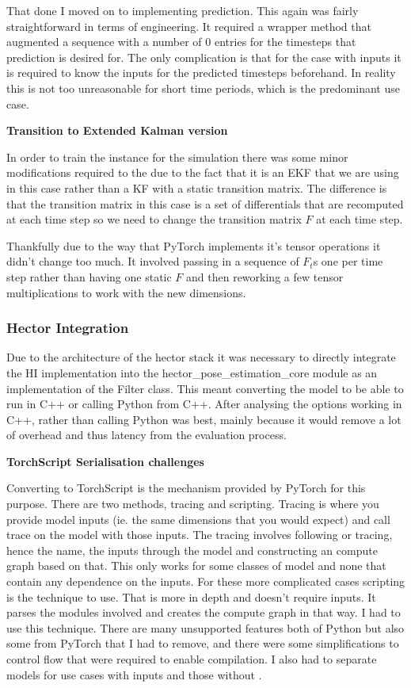 \documentclass[]{../resources/final_report}
\begin{document}
That done I moved on to implementing prediction. This again was fairly straightforward in terms of engineering. It required a wrapper method that augmented a sequence with a number of $0$ entries for the timesteps that prediction is desired for. The only complication is that for the case with inputs it is required to know the inputs for the predicted timesteps beforehand. In reality this is not too unreasonable for short time periods, which is the predominant use case.

\textbf{Transition to Extended Kalman version}

In order to train the instance for the simulation there was some minor modifications required to the due to the fact that it is an EKF that we are using in this case rather than a KF with a static transition matrix. The difference is that the transition matrix in this case is a set of differentials that are recomputed at each time step so we need to change the transition matrix $F$ at each time step.

Thankfully due to the way that PyTorch implements it's tensor operations it didn't change too much. It involved passing in a sequence of $F_t$s one per time step rather than having one static $F$ and then reworking a few tensor multiplications to work with the new dimensions.


\subsubsection{Hector Integration}

Due to the architecture of the hector stack it was necessary to directly integrate the HI implementation into the hector\_pose\_estimation\_core module as an implementation of the Filter class. This meant converting the model to be able to run in C++ or calling Python from C++. After analysing the options working in C++, rather than calling Python was best, mainly because it would remove a lot of overhead and thus latency from the evaluation process.

\pagebreak

\textbf{TorchScript Serialisation challenges}

Converting to TorchScript is the mechanism provided by PyTorch for this purpose. There are two methods, tracing and scripting. Tracing is where you provide model inputs (ie. the same dimensions that you would expect) and call trace on the model with those inputs. The tracing involves following or tracing, hence the name, the inputs through the model and constructing an compute graph based on that. This only works for some classes of model and none that contain any dependence on the inputs. For these more complicated cases scripting is the technique to use. That is more in depth and doesn't require inputs. It parses the modules involved and creates the compute graph in that way. I had to use this technique. There are many unsupported features both of Python but also some from PyTorch that I had to remove, and there were some simplifications to control flow that were required to enable compilation. I also had to separate models for use cases with inputs and those without \cite{torchscript}.
\end{document}
